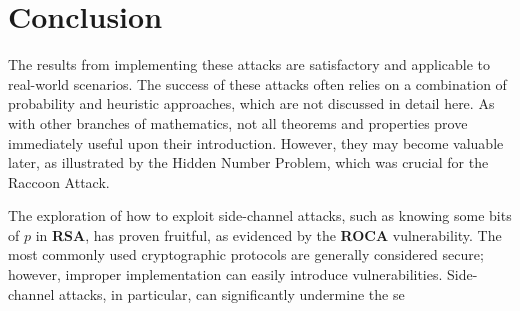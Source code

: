 \documentclass[a4paper,12pt]{report}
\begin{document}
% 
% 
% 
% 

\chapter*{Conclusion}

The results from implementing these attacks are satisfactory and applicable to real-world scenarios. The success of these attacks often relies on a combination of probability and heuristic approaches, which are not discussed in detail here. As with other branches of mathematics, not all theorems and properties prove immediately useful upon their introduction. However, they may become valuable later, as illustrated by the Hidden Number Problem, which was crucial for the Raccoon Attack.

The exploration of how to exploit side-channel attacks, such as knowing some bits of $p$ in \textbf{RSA}, has proven fruitful, as evidenced by the \textbf{ROCA} vulnerability. The most commonly used cryptographic protocols are generally considered secure; however, improper implementation can easily introduce vulnerabilities. Side-channel attacks, in particular, can significantly undermine the se
% 




\end{document}
